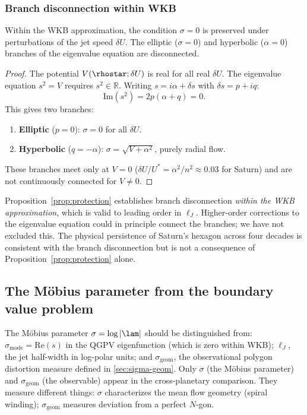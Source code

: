 \subsubsection{Branch disconnection within WKB}

\begin{proposition}\label{prop:protection}
Within the WKB approximation, the condition $\sigma = 0$ is preserved
under perturbations of the jet speed $\delta U$.  The elliptic
($\sigma = 0$) and hyperbolic ($\alpha = 0$) branches of the eigenvalue
equation are disconnected.
\end{proposition}

\begin{proof}
The potential $V(\rhostar; \delta U)$ is real for all real $\delta U$.
The eigenvalue equation $s^2 = V$ requires $s^2 \in \mathbb{R}$.
Writing $s = i\alpha + \delta s$ with $\delta s = p + iq$:
\[
  \mathrm{Im}(s^2) = 2p(\alpha + q) = 0.
\]
This gives two branches:
\begin{enumerate}
  \item \textbf{Elliptic} ($p = 0$): $\sigma = 0$ for all $\delta U$.
  \item \textbf{Hyperbolic} ($q = -\alpha$): $\sigma = \sqrt{V + \alpha^2}$,
    purely radial flow.
\end{enumerate}
These branches meet only at $V = 0$ ($\delta U/U^* = \alpha^2/n^2
\approx 0.03$ for Saturn) and are not continuously connected for
$V \neq 0$.
\end{proof}

\begin{remark}\label{rem:protection-scope}
Proposition~\ref{prop:protection} establishes branch disconnection
\emph{within the WKB approximation}, which is valid to leading order in
$\ell_J$.  Higher-order corrections to the eigenvalue equation could in
principle connect the branches; we have not excluded this.  The physical
persistence of Saturn's hexagon across four decades is consistent with
the branch disconnection but is not a consequence of
Proposition~\ref{prop:protection} alone.
\end{remark}

\subsection{The M\"obius parameter from the boundary value problem}

\begin{remark}\label{rem:sigmas}
The M\"obius parameter $\sigma = \log|\lam|$ should be distinguished from:
$\sigma_{\mathrm{mode}} = \mathrm{Re}(s)$ in the QGPV eigenfunction
(which is zero within WKB); $\ell_J$, the jet half-width in log-polar
units; and $\sigma_{\mathrm{geom}}$, the observational polygon distortion
measure defined in \cref{sec:sigma-geom}.  Only $\sigma$ (the M\"obius
parameter) and $\sigma_{\mathrm{geom}}$ (the observable) appear in the
cross-planetary comparison.  They measure different things:
$\sigma$ characterizes the mean flow geometry (spiral winding);
$\sigma_{\mathrm{geom}}$ measures deviation from a perfect $N$-gon.
\end{remark}

